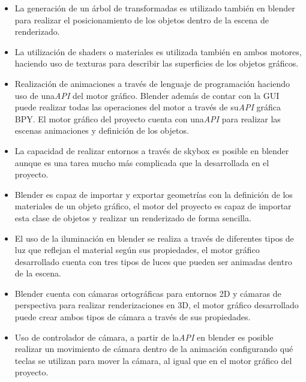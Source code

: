 \documentclass[a4paper]{book}
\begin{document}
\begin{itemize}
  \item La generación de un árbol de transformadas es utilizado también en blender para realizar el posicionamiento de
  los objetos dentro de la escena de renderizado.

  \item La utilización de shaders o materiales es utilizada también en ambos motores, haciendo uso de texturas para
  describir las superficies de los objetos gráficos.

  \item Realización de animaciones a través de lenguaje de programación haciendo uso de una\textit{API} del motor gráfico.
  Blender además de contar con la GUI puede realizar todas las operaciones del motor a través de su\textit{API} gráfica BPY.
  El motor gráfico del proyecto cuenta con una\textit{API} para realizar las escenas animaciones y definición de los objetos.

  \item La capacidad de realizar entornos a través de skybox es posible en blender aunque es una tarea mucho más
  complicada que la desarrollada en el proyecto.

  \item Blender es capaz de importar y exportar geometrías con la definición de los materiales de un objeto gráfico,
  el motor del proyecto es capaz de importar esta clase de objetos y realizar un renderizado de forma sencilla.

  \item El uso de la iluminación en blender se realiza a través de diferentes tipos de luz que reflejan el material
  según sus propiedades, el motor gráfico desarrollado cuenta con tres tipos de luces que pueden ser animadas dentro
  de la escena.

  \item Blender cuenta con cámaras ortográficas para entornos 2D y cámaras de perspectiva para realizar renderizaciones
   en 3D, el motor gráfico desarrollado puede crear ambos tipos de cámara a través de sus propiedades.

  \item Uso de controlador de cámara, a partir de la\textit{API} en blender es posible realizar un movimiento de cámara dentro
  de la animación configurando qué teclas se utilizan para mover la cámara, al igual que en el motor gráfico del proyecto.

\end{itemize}
\end{document}

